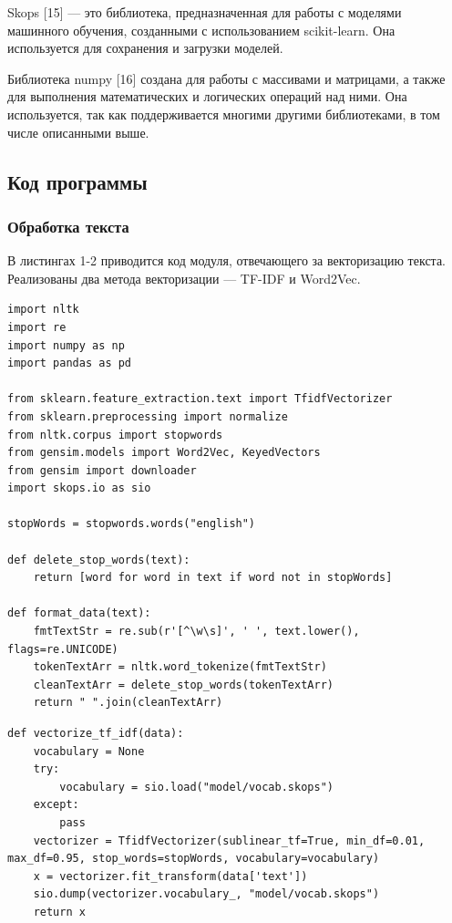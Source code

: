 \documentclass[a4paper, 12pt]{article}
\begin{document}
\begin{large}
Skops [15] --- это библиотека, предназначенная для работы с моделями машинного обучения, созданными с использованием scikit-learn. 
Она используется для сохранения и загрузки моделей.

Библиотека numpy [16] создана для работы с массивами и матрицами, а также для выполнения математических и логических операций над ними. 
Она используется, так как поддерживается многими другими библиотеками, в том числе описанными выше.

\subsection{Код программы}

\subsubsection{Обработка текста}
В листингах 1-2 приводится код модуля, отвечающего за векторизацию текста.
Реализованы два метода векторизации --- TF-IDF и Word2Vec.
\captionsetup{singlelinecheck=false, justification=raggedleft}
\begin{lstlisting}[caption={Модуль обработки текста}]
import nltk
import re
import numpy as np
import pandas as pd

from sklearn.feature_extraction.text import TfidfVectorizer
from sklearn.preprocessing import normalize
from nltk.corpus import stopwords
from gensim.models import Word2Vec, KeyedVectors
from gensim import downloader
import skops.io as sio

stopWords = stopwords.words("english")

def delete_stop_words(text):
    return [word for word in text if word not in stopWords]

def format_data(text):
    fmtTextStr = re.sub(r'[^\w\s]', ' ', text.lower(), flags=re.UNICODE)
    tokenTextArr = nltk.word_tokenize(fmtTextStr)
    cleanTextArr = delete_stop_words(tokenTextArr)
    return " ".join(cleanTextArr)
\end{lstlisting}
\begin{lstlisting}[caption={Модуль обработки текста}]
def vectorize_tf_idf(data):
    vocabulary = None
    try:
        vocabulary = sio.load("model/vocab.skops")
    except:
        pass
    vectorizer = TfidfVectorizer(sublinear_tf=True, min_df=0.01, max_df=0.95, stop_words=stopWords, vocabulary=vocabulary)
    x = vectorizer.fit_transform(data['text'])
    sio.dump(vectorizer.vocabulary_, "model/vocab.skops")
    return x


\end{lstlisting}
\end{large}
\end{document}
